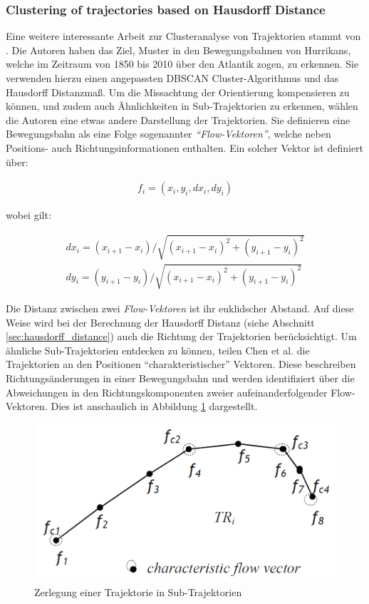\subsubsection*{Clustering of trajectories based on Hausdorff Distance}
Eine weitere interessante Arbeit zur Clusteranalyse von Trajektorien stammt von \cite[]{Chen2011}.
Die Autoren haben das Ziel, Muster in den Bewegungsbahnen von Hurrikans, welche im Zeitraum von 1850 bis 2010
über den Atlantik zogen, zu erkennen.
Sie verwenden hierzu einen angepassten DBSCAN Cluster-Algorithmus und das Hausdorff Distanzmaß.
Um die Missachtung der Orientierung kompensieren zu können, und zudem auch Ähnlichkeiten
in Sub-Trajektorien zu erkennen, wählen die Autoren eine etwas andere Darstellung der Trajektorien.
Sie definieren eine Bewegungsbahn als eine Folge sogenannter \textit{``Flow-Vektoren''}, welche neben
Positions- auch Richtungsinformationen enthalten. Ein solcher Vektor ist definiert über:

\begin{ceqn}
\begin{align}
    f_i = (x_i, y_i, dx_i, dy_i)
\end{align}
\end{ceqn}

wobei gilt:

\begin{ceqn}
\begin{align}
    dx_i = (x_{i+1} - x_i)/\sqrt{(x_{i+1} - x_i)^2 + (y_{i+1} - y_i)^2} \\
    dy_i = (y_{i+1} - y_i)/\sqrt{(x_{i+1} - x_i)^2 + (y_{i+1} - y_i)^2}
\end{align}
\end{ceqn}

Die Distanz zwischen zwei \textit{Flow-Vektoren} ist ihr euklidscher Abstand. Auf diese Weise wird bei
der Berechnung der Hausdorff Distanz (siehe Abschnitt \ref{sec:hausdorff_distance}) auch die Richtung
der Trajektorien berücksichtigt.
Um ähnliche Sub-Trajektorien entdecken zu können, teilen Chen et al. die Trajektorien an den Positionen
``charakteristischer'' Vektoren. Diese beschreiben Richtungsänderungen in einer
Bewegungsbahn und werden identifiziert über die Abweichungen in den Richtungskomponenten zweier
aufeinanderfolgender Flow-Vektoren. Dies ist anschaulich in Abbildung \ref{fig:relw_chen_flow_vector} dargestellt.

\begin{figure}[H]
    \centering
    \includegraphics[width=0.45\linewidth]{../resources/img/RelatedWork/Chen_trajectory_splitting}
    \caption[Zerlegung einer Trajektorie in Sub-Trajektorien]{Zerlegung einer Trajektorie in Sub-Trajektorien \cite[]{Chen2011}}
    \label{fig:relw_chen_flow_vector}
\end{figure}

